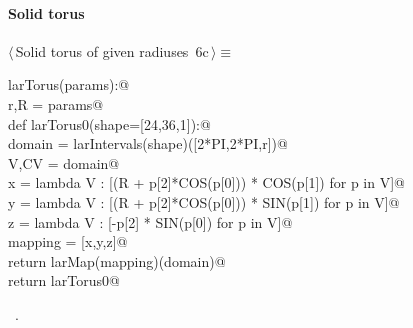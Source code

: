 \documentclass[11pt,oneside]{article}	%
\begin{document}
\paragraph{Solid torus}
\begin{flushleft} \small \label{scrap14}
\protect{}$\langle\,$Solid torus of given radiuses\nobreak\ {\footnotesize 6c}$\,\rangle\equiv$
\vspace{-1ex}
\begin{list}{}{} \item
\mbox{}\verb@def larTorus(params):@\\
\mbox{}\verb@   r,R = params@\\
\mbox{}\verb@   def larTorus0(shape=[24,36,1]):@\\
\mbox{}\verb@      domain = larIntervals(shape)([2*PI,2*PI,r])@\\
\mbox{}\verb@      V,CV = domain@\\
\mbox{}\verb@      x = lambda V : [(R + p[2]*COS(p[0])) * COS(p[1]) for p in V]@\\
\mbox{}\verb@      y = lambda V : [(R + p[2]*COS(p[0])) * SIN(p[1]) for p in V]@\\
\mbox{}\verb@      z = lambda V : [-p[2] * SIN(p[0]) for p in V]@\\
\mbox{}\verb@      mapping = [x,y,z]@\\
\mbox{}\verb@      return larMap(mapping)(domain)@\\
\mbox{}\verb@   return larTorus0@\\
\mbox{}\verb@@{\NWsep}
\end{list}
\vspace{-1ex}
\footnotesize\addtolength{\baselineskip}{-1ex}
\begin{list}{}{\setlength{\itemsep}{-\parsep}\setlength{\itemindent}{-\leftmargin}}
\item \NWtxtMacroRefIn\ .
\end{list}
\end{flushleft}
\end{document}
